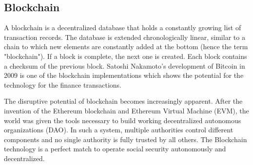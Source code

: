 \subsection{Blockchain}
A blockchain is a decentralized database that holds a constantly growing list of transaction records. The database is extended chronologically linear, similar to a chain to which new elements are constantly added at the bottom (hence the term "blockchain"). If a block is complete, the next one is created. Each block contains a checksum of the previous block. Satoshi Nakamoto's development of Bitcoin in 2009 is one of the blockchain implementations which shows the potential for the technology for the finance transactions. \cite{bitcoin}

The disruptive potential of blockchain becomes increasingly apparent. After the invention of the Ethereum blockchain and Ethereum Virtual Machine (EVM), the world was given the tools necessary to build working decentralized autonomous organizations (DAO). In such a system, multiple authorities control different components and no single authority is fully trusted by all others. \cite{cammarden} The Blockchain technology is a perfect match to operate social security autonomously and decentralized.